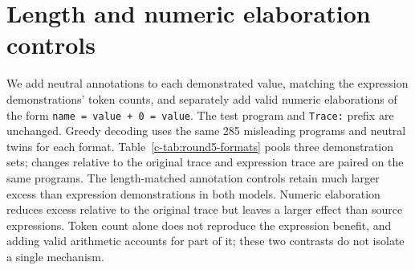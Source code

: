 \section{Length and numeric elaboration controls}
\label{c-app:round5-formats}
We add neutral annotations to each demonstrated value, matching the expression demonstrations' token counts, and separately add valid numeric elaborations of the form \texttt{name = value + 0 = value}. The test program and \texttt{Trace:} prefix are unchanged. Greedy decoding uses the same 285 misleading programs and neutral twins for each format. Table~\ref{c-tab:round5-formats} pools three demonstration sets; changes relative to the original trace and expression trace are paired on the same programs.
The length-matched annotation controls retain much larger excess than expression demonstrations in both models. Numeric elaboration reduces excess relative to the original trace but leaves a larger effect than source expressions. Token count alone does not reproduce the expression benefit, and adding valid arithmetic accounts for part of it; these two contrasts do not isolate a single mechanism.
\begin{table}[t]
\centering\small
{}
\ifdim\wd\roundfivebox>\textwidth\resizebox{\textwidth}{!}{\usebox{\roundfivebox}}\else\usebox{\roundfivebox}\fi
\caption{Excess name errors and paired changes in percentage points [95\% interval]. Bootstrap clusters keep all demonstration repeats for each matched program together. These controls assess length and numeric elaboration; they do not by themselves establish how expressions change generation.}
\label{c-tab:round5-formats}
\end{table}
